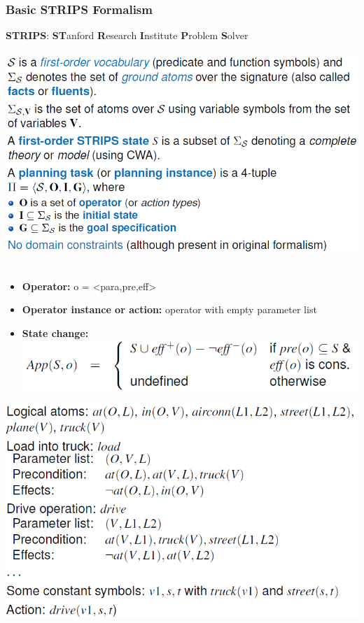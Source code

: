 \documentclass{article}
\begin{document}
\subsubsection{Basic STRIPS Formalism}
\textbf{STRIPS}: \textbf{ST}anford \textbf{R}esearch \textbf{I}nstitute \textbf{P}roblem \textbf{S}olver\\\\
\includegraphics[scale=0.6]{49.png}\\\\
\begin{itemize}
\item \textbf{Operator: }o = <para,pre,eff>
\item \textbf{Operator instance or action: }operator with empty parameter list
\item \textbf{State change: }\includegraphics[scale=0.6]{50.png}
\end{itemize}
\includegraphics[scale=0.6]{51.png}\\\\
\end{document}

